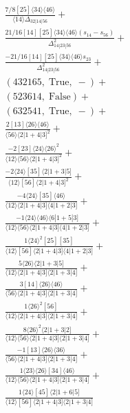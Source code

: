 \documentclass[varwidth, border=5pt]{standalone}
\begin{document}
\begin{my}
$\begin{gathered}
\scriptscriptstyle\frac{7/8[25]⟨34⟩⟨46⟩}{⟨14⟩Δ_{32|14|56}}+\\
\scriptscriptstyle\frac{21/16[14][25]⟨34⟩⟨46⟩(s_{14}-s_{56})}{Δ_{14|23|56}^2}+\\
\scriptscriptstyle\frac{-21/16[14][25]⟨34⟩⟨46⟩s_{23}}{Δ_{14|23|56}^2}+\\
\scriptscriptstyle(432165,\;\text{True},\;-)+\\
\scriptscriptstyle(523614,\;\text{False})+\\
\scriptscriptstyle(632541,\;\text{True},\;-)+\\
\scriptscriptstyle\frac{2[13]⟨26⟩⟨46⟩}{⟨56⟩⟨2|1+4|3]^2}+\\
\scriptscriptstyle\frac{-2[23]⟨24⟩⟨26⟩^2}{⟨12⟩⟨56⟩⟨2|1+4|3]^2}+\\
\scriptscriptstyle\frac{-2⟨24⟩[35]⟨2|1+3|5]}{⟨12⟩[56]⟨2|1+4|3]^2}+\\
\scriptscriptstyle\frac{-4⟨24⟩[35]⟨46⟩}{⟨12⟩⟨2|1+4|3]⟨4|1+2|3]}+\\
\scriptscriptstyle\frac{-1⟨24⟩⟨46⟩⟨6|1+5|3]}{⟨12⟩⟨56⟩⟨2|1+4|3]⟨4|1+2|3]}+\\
\scriptscriptstyle\frac{1⟨24⟩^2[25][35]}{⟨12⟩[56]⟨2|1+4|3]⟨4|1+2|3]}+\\
\scriptscriptstyle\frac{5⟨26⟩⟨2|1+3|5]}{⟨12⟩⟨2|1+4|3]⟨2|1+3|4]}+\\
\scriptscriptstyle\frac{3[14]⟨26⟩⟨46⟩}{⟨56⟩⟨2|1+4|3]⟨2|1+3|4]}+\\
\scriptscriptstyle\frac{1⟨26⟩^2[56]}{⟨12⟩⟨2|1+4|3]⟨2|1+3|4]}+\\
\scriptscriptstyle\frac{8⟨26⟩^2⟨2|1+3|2]}{⟨12⟩⟨56⟩⟨2|1+4|3]⟨2|1+3|4]}+\\
\scriptscriptstyle\frac{-1[13]⟨26⟩⟨36⟩}{⟨56⟩⟨2|1+4|3]⟨2|1+3|4]}+\\
\scriptscriptstyle\frac{1⟨23⟩⟨26⟩[34]⟨46⟩}{⟨12⟩⟨56⟩⟨2|1+4|3]⟨2|1+3|4]}+\\
\scriptscriptstyle\frac{1⟨24⟩[45]⟨2|1+6|5]}{⟨12⟩[56]⟨2|1+4|3]⟨2|1+3|4]}\phantom{+}
\end{gathered}$
\end{my}
\end{document}
